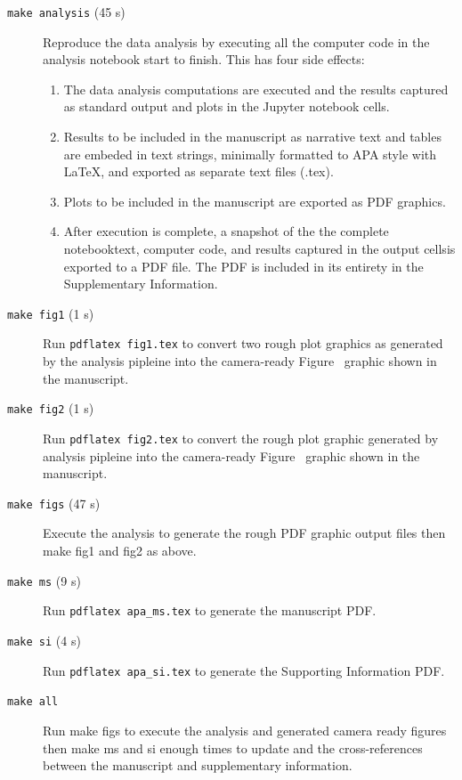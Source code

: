 \documentclass[helv,10pt,man,floatsintext]{apa6}  %
\begin{document}
\begin{description}

\item [\texttt{make analysis} (45 s)] Reproduce the data analysis by
  executing all the computer code in the analysis notebook start to
  finish. This has four side effects:

\begin{enumerate}
  \item The data analysis computations are executed and the results captured
    as standard output and plots in the Jupyter notebook cells. 
  \item Results to be included in the manuscript as narrative text and
    tables are embeded in text strings, minimally formatted to APA
    style with \LaTeX{}, and exported as separate text files (.tex).
  \item Plots to be included in the manuscript are exported as PDF graphics.
  \item After execution is complete, a snapshot of the the complete
    notebook\textemdash text, computer code, and results captured in
    the output cells\textemdash is exported to a PDF file. The PDF is
    included in its entirety in the Supplementary Information.
\end{enumerate}  

\item [\texttt{make fig1} (1 s)] Run
  \texttt{pdflatex fig1.tex} to convert two rough plot
  graphics as generated by the analysis pipleine into the camera-ready
  Figure~ graphic shown in the manuscript.

\item [\texttt{make fig2} (1 s)] Run \texttt{pdflatex fig2.tex}
  to convert the rough plot graphic generated by analysis
  pipleine into the camera-ready Figure~ graphic shown in the
  manuscript.

\item [\texttt{make figs} (47 s)] Execute the analysis to generate the rough PDF graphic
  output files then make fig1 and fig2 as above. 

\item [\texttt{make ms} (9 s)] Run \texttt{pdflatex apa_ms.tex}
  to generate the manuscript PDF.

\item [\texttt{make si} (4 s)] Run \texttt{pdflatex apa_si.tex}
   to generate the Supporting Information PDF.

\item [\texttt{make all}] Run make figs to execute the
  analysis and generated camera ready figures then make ms and si
  enough times to update and the cross-references between the
  manuscript and supplementary information.

\end{description}
\end{document}
